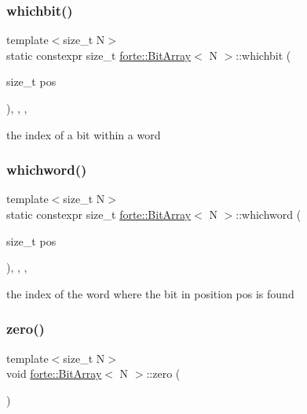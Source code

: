 \subsubsection{\texorpdfstring{whichbit()}{whichbit()}}
{\footnotesize\ttfamily template$<$size\+\_\+t N$>$ \\
static constexpr size\+\_\+t \mbox{\hyperlink{classforte_1_1_bit_array}{forte\+::\+Bit\+Array}}$<$ N $>$\+::whichbit (\begin{DoxyParamCaption}\item[{size\+\_\+t}]{pos }\end{DoxyParamCaption})\hspace{0.3cm}{\ttfamily [inline]}, {\ttfamily [static]}, {\ttfamily [protected]}, {\ttfamily [noexcept]}}



the index of a bit within a word 

\mbox{\label{classforte_1_1_bit_array_a4da96fee16fe9fbad29d58bced1b13d1}} 
\subsubsection{\texorpdfstring{whichword()}{whichword()}}
{\footnotesize\ttfamily template$<$size\+\_\+t N$>$ \\
static constexpr size\+\_\+t \mbox{\hyperlink{classforte_1_1_bit_array}{forte\+::\+Bit\+Array}}$<$ N $>$\+::whichword (\begin{DoxyParamCaption}\item[{size\+\_\+t}]{pos }\end{DoxyParamCaption})\hspace{0.3cm}{\ttfamily [inline]}, {\ttfamily [static]}, {\ttfamily [protected]}, {\ttfamily [noexcept]}}



the index of the word where the bit in position pos is found 

\mbox{\label{classforte_1_1_bit_array_ab9e015d5e061725d21562ce068dc3dbb}} 
\subsubsection{\texorpdfstring{zero()}{zero()}}
{\footnotesize\ttfamily template$<$size\+\_\+t N$>$ \\
void \mbox{\hyperlink{classforte_1_1_bit_array}{forte\+::\+Bit\+Array}}$<$ N $>$\+::zero (\begin{DoxyParamCaption}{ }\end{DoxyParamCaption})\hspace{0.3cm}{\ttfamily [inline]}}



